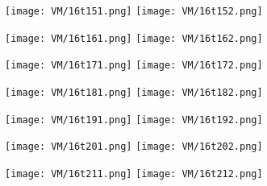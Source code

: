 

\begin{figure}[h]
		\centering
		\texttt{[image: VM/16t151.png]}
		\texttt{[image: VM/16t152.png]}
\label{ris:image}
\end{figure}



\begin{figure}[h]
		\centering
		\texttt{[image: VM/16t161.png]}
		\texttt{[image: VM/16t162.png]}
\label{ris:image}
\end{figure}



\begin{figure}[h]
		\centering
		\texttt{[image: VM/16t171.png]}
		\texttt{[image: VM/16t172.png]}
\label{ris:image}
\end{figure}



\begin{figure}[h]
		\centering
		\texttt{[image: VM/16t181.png]}
		\texttt{[image: VM/16t182.png]}
\label{ris:image}
\end{figure}



\begin{figure}[h]
		\centering
		\texttt{[image: VM/16t191.png]}
		\texttt{[image: VM/16t192.png]}
\label{ris:image}
\end{figure}



\begin{figure}[h]
		\centering
		\texttt{[image: VM/16t201.png]}
		\texttt{[image: VM/16t202.png]}
\label{ris:image}
\end{figure}



\begin{figure}[h]
		\centering
		\texttt{[image: VM/16t211.png]}
		\texttt{[image: VM/16t212.png]}
\label{ris:image}
\end{figure}

